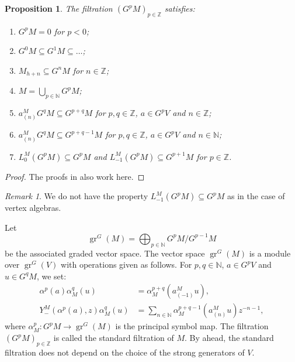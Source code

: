 \documentclass[a4paper, 12pt, reqno]{amsart}
\newtheorem{proposition}[theorem]{Proposition}
\theoremstyle{remark}
\newtheorem{remark}[theorem]{Remark}
\DeclareMathOperator{\gr}{gr}
\begin{document}
\begin{proposition}
  \label{prp:17}
  The filtration $(G^pM)_{p \in \mathbb{Z}}$ satisfies:
  \begin{enumerate}
  \item $G^pM = 0$ for $p < 0$;
  \item $G^0M \subseteq G^1M \subseteq \dots$;
  \item $M_{h + n} \subseteq G^nM$ for $n \in \mathbb{Z}$;
  \item $M = \bigcup_{p \in \mathbb{N}}G^pM$;
  \item $a^M_{(n)}G^qM \subseteq G^{p + q}M$ for $p, q \in \mathbb{Z}$, $a \in G^pV$ and $n \in \mathbb{Z}$;
  \item $a^M_{(n)}G^qM \subseteq G^{p + q - 1}M$ for $p, q \in \mathbb{Z}$, $a \in G^pV$ and $n \in \mathbb{N}$;
  \item $L^M_0(G^pM) \subseteq G^pM$ and $L^M_{-1}(G^pM) \subseteq G^{p + 1}M$ for $p \in \mathbb{Z}$.
  \end{enumerate}
\end{proposition}

\begin{proof}
  The proofs in \cite{li_vertex_2004} also work here.
\end{proof}

\begin{remark}
  \label{rmk:41}
  We do not have the property $L_{-1}^M(G^pM) \subseteq G^pM$ as in the case of vertex algebras.
\end{remark}

Let
\begin{equation*}
  \gr^G(M) = \bigoplus_{p \in \mathbb{N}}G^pM/G^{p - 1}M
\end{equation*}
be the associated graded vector space.
The vector space $\gr^G(M)$ is a module over $\gr^G(V)$ with operations given as follows.
For $p, q \in \mathbb{N}$, $a \in G^pV$ and $u \in G^qM$, we set:
\begin{align*}
  \alpha^p(a)\alpha_M^q(u) &= \alpha_M^{p + q}(a^M_{(-1)}u), \\
  Y^M_-(\alpha^p(a), z)\alpha_M^q(u) &= \sum_{n \in \mathbb{N}}\alpha_M^{p + q - 1}(a^M_{(n)}u)z^{-n - 1},
\end{align*}
where $\alpha_M^p: G^pM \to \gr^G(M)$ is the principal symbol map.
The filtration $(G^pM)_{p \in \mathbb{Z}}$ is called the standard filtration of $M$.
By  ahead, the standard filtration does not depend on the choice of the strong generators of $V$.
\end{document}
